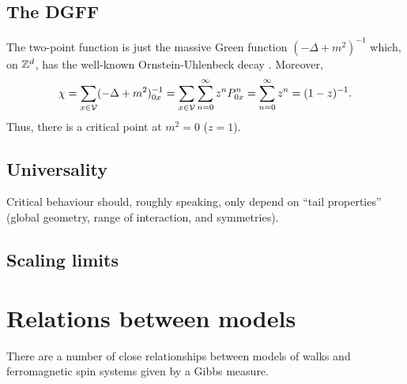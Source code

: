 
\subsection{The DGFF}

The two-point function is just the massive Green function $(-\Delta + m^2)^{-1}$
which, on ${ {{\mathbb Z}}^d }$, has the well-known Ornstein-Uhlenbeck decay .
Moreover,
\begin{equation}
\chi
  =
\sum_{x\in\mathcal{V}} (-\Delta + m^2)^{-1}_{0x}
  =
\sum_{x\in\mathcal{V}} \sum_{n=0}^\infty z^n P^n_{0x}
  =
\sum_{n=0}^\infty z^n
  =
(1 - z)^{-1}.
\end{equation}
Thus, there is a critical point at $m^2 = 0$ ($z = 1$).




\subsection{Universality}

Critical behaviour should, roughly speaking, only depend on ``tail properties''
(global geometry, range of interaction, and symmetries).


\subsection{Scaling limits}


\section{Relations between models}

There are a number of close relationships between models of walks and ferromagnetic spin
systems given by a Gibbs measure.

